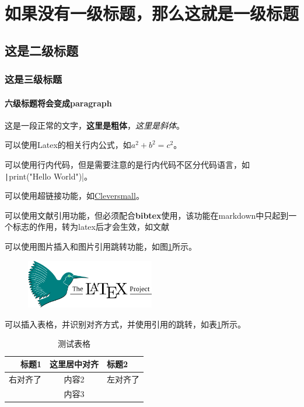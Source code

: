 \section{如果没有一级标题，那么这就是一级标题}

\subsection{这是二级标题}

\subsubsection{这是三级标题}

\paragraph{六级标题将会变成paragraph}

这是一段正常的文字，\textbf{这里是粗体}，\textit{这里是斜体}。

可以使用Latex的相关行内公式，如$a^2+b^2=c^2$。

可以使用行内代码，但是需要注意的是行内代码不区分代码语言，如 \texttt|print("Hello World")|。

可以使用超链接功能，如\href{https://www.cleversmall.com}{Cleversmall}。

可以使用文献引用功能，但必须配合\textbf{bibtex}使用，该功能在markdown中只起到一个标志的作用，转为latex后才会生效，如文献\cite{name2024paper}

可以使用图片插入和图片引用跳转功能，如图\ref{fig1}所示。

\begin{figure}[ht]
    \centering
    \includegraphics[width=0.50\textwidth]{./figure/latex_bird.png}
    \label{fig1}
\end{figure}

可以插入表格，并识别对齐方式，并使用引用的跳转，如表\ref{tab1}所示。

\begin{table}[ht]
    \centering
    \caption{测试表格}
    \begin{tabular}{rcl}
        \toprule
        \textbf{标题1}&\textbf{这里居中对齐}&\textbf{标题2} \\
        \midrule
          右对齐了  &     内容2     &  左对齐了   \\
                    &     内容3     &             \\
        \bottomrule
    \end{tabular}
    \label{tab1}
\end{table}


